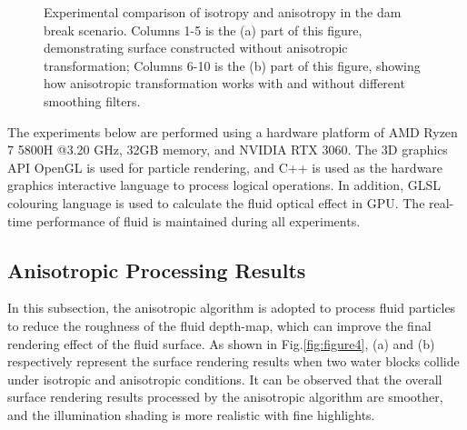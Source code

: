 \documentclass[times,twocolumn,final]{elsarticle}
\begin{document}
\begin{figure}[!t]
    \centering
    \caption{Experimental comparison of isotropy and anisotropy in the dam break scenario. Columns 1-5 is the (a) part of this figure, demonstrating surface constructed without anisotropic transformation; Columns 6-10 is the (b) part of this figure, showing how anisotropic transformation works with and without different smoothing filters.}
    \label{fig:ball_iso&aniso}
\end{figure}

The experiments below are performed using a hardware platform of AMD Ryzen 7 5800H @3.20 GHz, 32GB memory, and NVIDIA RTX 3060. The 3D graphics API OpenGL is used for particle rendering, and C++ is used as the hardware graphics interactive language to process logical operations. In addition, GLSL colouring language is used to calculate the fluid optical effect in GPU. The real-time performance of fluid is maintained during all experiments.

\subsection{Anisotropic Processing Results}
In this subsection, the anisotropic algorithm is adopted to process fluid particles to reduce the roughness of the fluid depth-map, which can improve the final rendering effect of the fluid surface. As shown in Fig.\ref{fig:figure4}, (a) and (b) respectively represent the surface rendering results when two water blocks collide under isotropic and anisotropic conditions. It can be observed that the overall surface rendering results processed by the anisotropic algorithm are smoother, and the illumination shading is more realistic with fine highlights.
\end{document}
